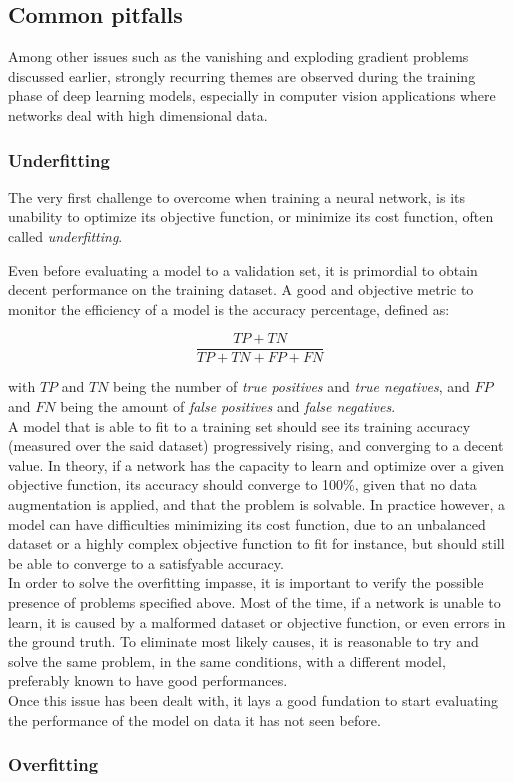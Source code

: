 \subsection{Common pitfalls}

Among other issues such as the vanishing and exploding gradient problems
discussed earlier, strongly recurring themes are observed during the training
phase of deep learning models, especially in computer vision applications where
networks deal with high dimensional data.

	\subsubsection{Underfitting}
The very first challenge to overcome when training a neural network, is its
unability to optimize its objective function, or minimize its cost function,
often called \emph{underfitting}.

Even before evaluating a model to a validation set, it is primordial to obtain
decent performance on the training dataset. A good and objective metric to
monitor the efficiency of a model is the accuracy percentage, defined as:

\begin{equation}
	\frac{TP+TN}{TP+TN+FP+FN}
\end{equation}

with $TP$ and $TN$ being the number of \emph{true positives} and \emph{true
negatives}, and $FP$ and $FN$ being the amount of \emph{false positives} and
\emph{false negatives}.\\

A model that is able to fit to a training set should see its training accuracy
(measured over the said dataset) progressively rising, and converging to a
decent value. In theory, if a network has the capacity to learn and optimize
over a given objective function, its accuracy should converge to 100\%, given
that no data augmentation is applied, and that the problem is solvable. In
practice however, a model can have difficulties minimizing its cost function,
due to an unbalanced dataset or a highly complex objective function to fit for
instance, but should still be able to converge to a satisfyable accuracy.\\

In order to solve the overfitting impasse, it is important to verify the
possible presence of problems specified above. Most of the time, if a network
is unable to learn, it is caused by a malformed dataset or objective function,
or even errors in the ground truth. To eliminate most likely causes, it is
reasonable to try and solve the same problem, in the same conditions, with a
different model, preferably known to have good performances.\\

Once this issue has been dealt with, it lays a good fundation to start
evaluating the performance of the model on data it has not seen before.

	\subsubsection{Overfitting}
